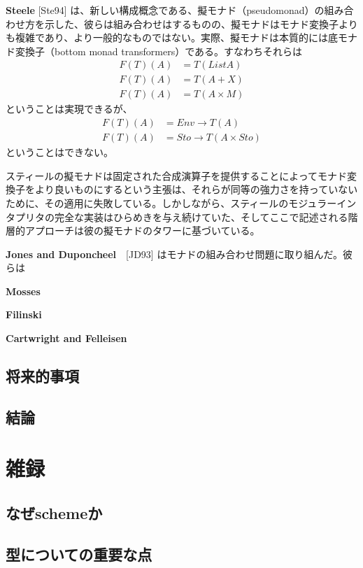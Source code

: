 \documentclass[11pt, oneside]{jsbook}   	%
\begin{document}
{\bf Steele} [Ste94] は、新しい構成概念である、擬モナド（pseudomonad）の組み合わせ方を示した、彼らは組み合わせはするものの、擬モナドはモナド変換子よりも複雑であり、より一般的なものではない。実際、擬モナドは本質的には底モナド変換子（bottom monad transformers）である。すなわちそれらは
$$
\begin{aligned}
F(T)(A) & = T(List A)\\
F(T)(A) &= T(A+X)\\
F(T)(A) &= T(A \times M)
\end{aligned}
$$
ということは実現できるが、
$$
\begin{aligned}
F(T)(A) &= Env \rightarrow T(A)\\
F(T)(A) &= Sto \rightarrow T(A \times Sto)
\end{aligned}
$$
ということはできない。

スティールの擬モナドは固定された合成演算子を提供することによってモナド変換子をより良いものにするという主張は、それらが同等の強力さを持っていないために、その適用に失敗している。しかしながら、スティールのモジュラーインタプリタの完全な実装はひらめきを与え続けていた、そしてここで記述される階層的アプローチは彼の擬モナドのタワーに基づいている。

{\bf Jones and Duponcheel}　[JD93] はモナドの組み合わせ問題に取り組んだ。彼らは

{\bf Mosses}

{\bf Filinski}

{\bf Cartwright and Felleisen}


\section{ 将来的事項 }
\section{ 結論 }



\newpage
\renewcommand{\thesection}{\Alph{section}}
\renewcommand{\thesubsection}{\thesection-\arabic{subsection}}
\setcounter{section}{0}

\chapter{ 雑録 }
\section{ なぜschemeか }
\section{ 型についての重要な点 }
\end{document}
